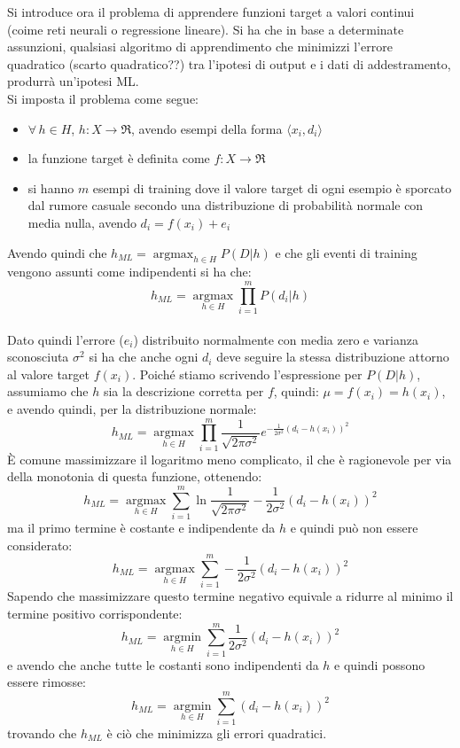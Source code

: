 Si introduce ora il problema di apprendere funzioni target a valori continui (coime reti neurali o regressione lineare). Si ha che in base a determinate assunzioni, qualsiasi algoritmo di apprendimento che minimizzi l'errore quadratico (scarto quadratico??) tra l'ipotesi di output e i dati di addestramento, produrrà un'ipotesi ML.\\
Si imposta il problema come segue:
\begin{itemize}
    \item $\forall\,h\in H$,  $h:X\to\Re$, avendo esempi della forma $\langle x_i, d_i\rangle$
    \item la funzione target è definita come $f:X\to\Re$
    \item si hanno $m$ esempi di training dove il valore target di ogni esempio è sporcato dal rumore casuale secondo una distribuzione di probabilità normale con media nulla, avendo $d_i=f(x_i)+e_i$
\end{itemize}

Avendo quindi che $h_{ML}=\operatorname*{argmax}_{h\in H}P(D|h)$ e che gli eventi di training vengono assunti come indipendenti si ha che: $$h_{ML}=\operatorname*{argmax}_{h\in H}\prod_{i=1}^mP(d_i|h)$$ \\

Dato quindi l'errore ($e_i$) distribuito normalmente con media zero e varianza sconosciuta $\sigma^2$ si ha che anche ogni $d_i$ deve seguire la stessa distribuzione attorno al valore target $f(x_i)$. Poiché stiamo scrivendo l'espressione per $P(D|h)$, assumiamo che $h$ sia la descrizione corretta per $f$, quindi: $\mu=f(x_i)=h(x_i)$, e avendo quindi, per la distribuzione normale: 
\[h_{ML}=\operatorname*{argmax}_{h\in H} \prod_{i=1}^m\frac{1}{\sqrt{2\pi\sigma^2}} e^{-\frac{1}{2\sigma^2}(d_i-h(x_i))^2}\]
È comune massimizzare il logaritmo meno complicato, il che è ragionevole per via della monotonia di questa funzione, ottenendo:
\[h_{ML}=\operatorname*{argmax}_{h\in H}\sum_{i=1}^m\ln{\frac{1}{\sqrt{2\pi\sigma^2}}} -\frac{1}{2\sigma^2}(d_i-h(x_i))^2\]
ma il primo termine è costante e indipendente da $h$ e quindi può non essere considerato:
\[h_{ML}=\operatorname*{argmax}_{h\in H}\sum_{i=1}^m -\frac{1}{2\sigma^2}(d_i-h(x_i))^2\]
Sapendo che massimizzare questo termine negativo equivale a ridurre al minimo il termine positivo corrispondente:
\[h_{ML}=\operatorname*{argmin}_{h\in H}\sum_{i=1}^m \frac{1}{2\sigma^2}(d_i-h(x_i))^2\]
e avendo che anche tutte le costanti sono indipendenti da $h$ e quindi possono essere rimosse:
\[h_{ML}=\operatorname*{argmin}_{h\in H}\sum_{i=1}^m (d_i-h(x_i))^2\]
trovando che $h_{ML}$ è ciò che minimizza gli errori quadratici. \\

